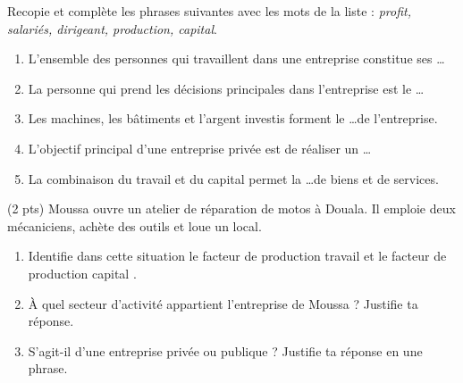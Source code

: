 \documentclass[11pt]{article}
\begin{document}
\begin{exercice}
Recopie et complète les phrases suivantes avec les mots de la liste : \emph{profit, salariés, dirigeant, production, capital}.
\begin{enumerate}
\item L'ensemble des personnes qui travaillent dans une entreprise constitue ses \ldots
\item La personne qui prend les décisions principales dans l'entreprise est le \ldots
\item Les machines, les bâtiments et l'argent investis forment le \ldots de l'entreprise.
\item L'objectif principal d'une entreprise privée est de réaliser un \ldots
\item La combinaison du travail et du capital permet la \ldots de biens et de services.
\end{enumerate}
\end{exercice}

\begin{exercice} (2 pts)
Moussa ouvre un atelier de réparation de motos à Douala. Il emploie deux mécaniciens, achète des outils et loue un local.
\begin{enumerate}
\item Identifie dans cette situation le facteur de production \og travail \fg et le facteur de production \og capital \fg.
\item À quel secteur d'activité appartient l'entreprise de Moussa ? Justifie ta réponse.
\item S'agit-il d'une entreprise privée ou publique ? Justifie ta réponse en une phrase.
\end{enumerate}
\end{exercice}
\end{document}
